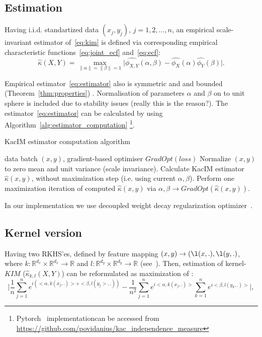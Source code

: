 \documentclass{article}
\begin{document}
\subsection{Estimation}

Having i.i.d. standartized data $(x_{j}, y_{j})$, $j = 1,2,...,n$, an empirical scale-invariant estimator of~\eqref{eq:kim} is defined via corresponding empirical characteristic functions~\eqref{eq:joint_ecf} and~\eqref{eq:ecf}:
\begin{equation}
\label{eq:estimator}
    \hat{\kappa}(X,Y) = \max_{\|\alpha\| = \|\beta\| = 1} \vert \widehat{\phi_{X,Y}}(\alpha,\beta)  - \widehat{\phi_{X}}(\alpha) \widehat{\phi_{Y}}(\beta) \vert.
\end{equation}

\noindent Empirical estimator~\eqref{eq:estimator} also is symmetric and and bounded (Theorem~\ref{thm:properties}) . Normalisation of parameters $\alpha$ and $\beta$ on to unit sphere is included due to stability issues (really this is the reason?). The  estimator~\eqref{eq:estimator} can be calculated by using Algorithm~\ref{alg:estimator_computation} \footnote{ Pytorch~\cite{NEURIPS2019_9015} implementationcan be accessed from \url{https://github.com/povidanius/kac_independence_measure}}. 

\begin{algorithm}
\caption{KacIM estimator computation algorithm}\label{alg:estimator_computation}
\begin{algorithmic}
\Require data batch $(x,y)$, gradient-based optimiser $GradOpt(loss)$
\State Normalize $(x,y)$ to zero mean and unit variance (scale invariance).
\State Calculate KacIM estimator $\hat{\kappa}(x,y)$, without maximization step (i.e. using current $\alpha, \beta$).
\State Perform one maximization iteration of computed $\hat{\kappa}(x,y)$ via $\alpha, \beta \rightarrow GradOpt(\hat{\kappa}(x,y))$.
\end{algorithmic}
\end{algorithm}
In our implementation we use decoupled weight decay regularization optimizer~\cite{Loshchilov2019DecoupledWD}.

\subsection{Kernel version}

Having two RKHS'es, defined by feature mapping $(x,y) \rightarrow (\l(x,.), \l(y,.)$, where $k: \mathbb{R}^{d_{x}} \times \mathbb{R}^{d_{x}} \rightarrow \mathbb{R}$ and $l: \mathbb{R}^{d_{y}} \times \mathbb{R}^{d_{y}} \rightarrow \mathbb{R}$ (see~\cite{10.5555/3279302}). Then, estimation of kernel-$KIM$ ($\hat{\kappa}_{k,l} (X,Y)$) can be reformulated as maximization of :
\begin{equation}
\label{eq:kernel_estimator}
    \vert \frac{1}{n} \sum_{j=1}^{n} e^{i(<\alpha, k(x_{j},.)> + <\beta, l(y_{j}>,.)) } - \frac{1}{n^2} \sum_{j=1}^{n} e^{i <\alpha, k(x_{j},.)>}\sum_{k=1}^{n} e^{i<\beta, l(y_{k},.)>}\vert,
\end{equation}
\end{document}
